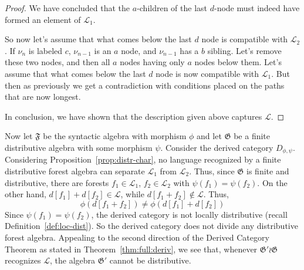 \documentclass[sigplan,9pt]{acmart}\settopmatter{printfolios=true,printccs=false,printacmref=false}
\newcounter{thm}
\theoremstyle{definition}
\newcommand{\La}[0]{{\mathcal{L}}}
\newcommand{\Ff}[0]{{\mathfrak{F}}}
\newcommand{\Gg}[0]{{\mathfrak{G}}}
\begin{document}
\begin{proof}
We have concluded that the $a$-children of the last $d$-node must indeed have formed an element of $\La_1$.

So now let's assume that what comes below the last $d$ node is compatible with $\La_2$.
If $\nu_n$ is labeled $c$, $\nu_{n-1}$ is an $a$ node, and $\nu_{n-1}$ has a $b$ sibling.
Let's remove these two nodes, and then all $a$ nodes having only $a$ nodes below them.
Let's assume that what comes below the last $d$ node is now compatible with $\La_1$.
But then as previously we get a contradiction with conditions placed on the paths that are now longest.

In conclusion, we have shown that the description given above captures $\La$.
\end{proof}


Now let $\Ff$ be the syntactic algebra with morphism $\phi$ and let $\Gg$ be a finite distributive algebra with some morphism $\psi$.
Consider the derived category $D_{\phi,\psi}$.
Considering Proposition~\ref{prop:distr-char}, no language recognized by a finite distributive forest algebra can separate $\La_1$ from $\La_2$.
Thus, since $\Gg$ is finite and distributive, there are forests $f_1 \in \La_1$, $f_2 \in \La_2$ with $\psi(f_1) = \psi(f_2)$.
On the other hand, $d[f_1]+d[f_2] \in \La$, while $d[f_1+f_2] \not\in \La$. Thus,
$$\phi(d[f_1+f_2]) \neq \phi(d[f_1]+d[f_2])$$
Since $\psi(f_1) = \psi(f_2)$, the derived category is not locally distributive (recall Definition~\ref{def:loc-dist}).
So the derived category does not divide any distributive forest algebra.
Appealing to the second direction of the Derived Category Theorem as stated in Theorem~\ref{thm:full:deriv}, we see that, whenever $\Gg' \wr \Gg$ recognizes $\La$, the algebra $\Gg'$ cannot be distributive.
\end{document}
